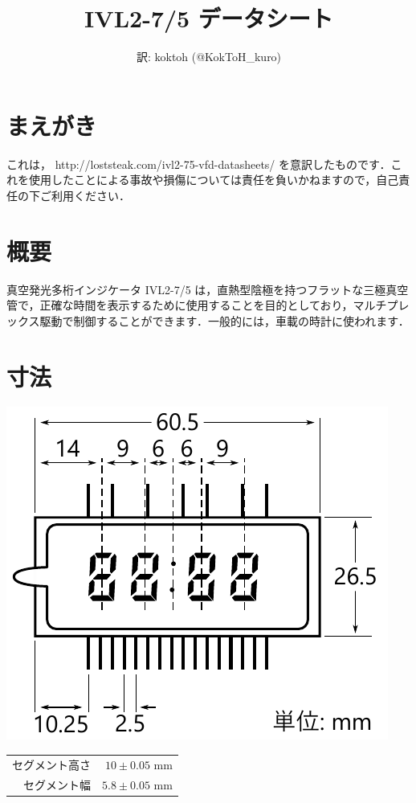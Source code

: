 \documentclass[12pt]{jarticle}
\title{IVL2-7/5 データシート}
\author{訳: koktoh (@KokToH\_kuro)}
\date{}
\begin{document}
\maketitle

\section*{まえがき}

これは， http://loststeak.com/ivl2-75-vfd-datasheets/ を意訳したものです．これを使用したことによる事故や損傷については責任を負いかねますので，自己責任の下ご利用ください．

\section{概要}

真空発光多桁インジケータ IVL2-7/5 は，直熱型陰極を持つフラットな三極真空管で，正確な時間を表示するために使用することを目的としており，マルチプレックス駆動で制御することができます．一般的には，車載の時計に使われます．

\section{寸法}

\begin{minipage}{0.6\linewidth}
    \centering
    \includegraphics[width=\linewidth]{../img/IVL275_size.pdf}
\end{minipage}
\hfill
\begin{minipage}[b]{0.35\linewidth}
    \begin{tabular}{rr}
        セグメント高さ & \(10\pm0.05\)  mm \\
        セグメント幅   & \(5.8\pm0.05\) mm
    \end{tabular}
\end{minipage}
\end{document}
